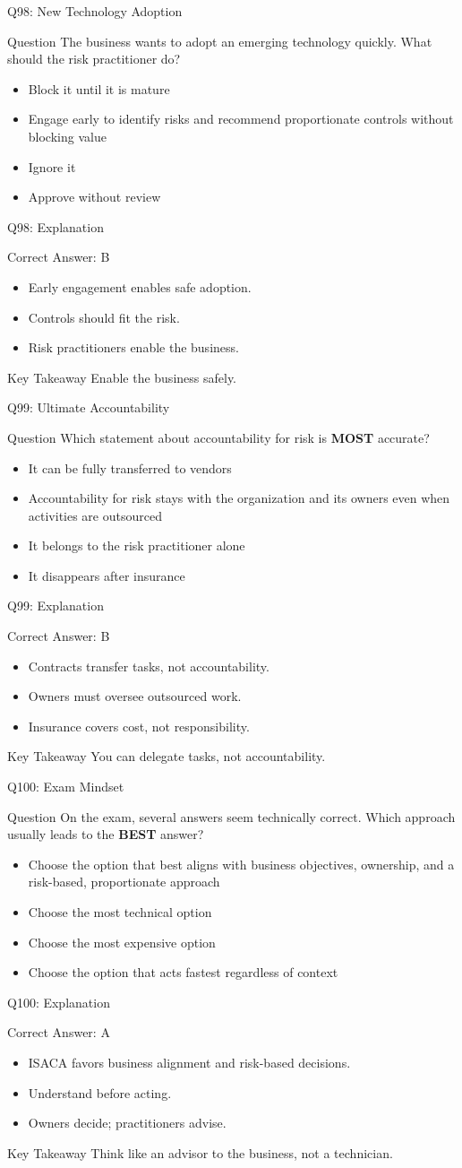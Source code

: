 \documentclass[aspectratio=169]{beamer}
\newcommand{\hq}[7]{%
	\begin{frame}{Q#1: #2}
		\begin{block}{Question}
			#3
		\end{block}
		\begin{itemize}
			#4
		\end{itemize}
	\end{frame}
	\begin{frame}{Q#1: Explanation}
		\begin{block}{Correct Answer: #5}
			\begin{itemize}
				#6
			\end{itemize}
		\end{block}
		\begin{alertblock}{Key Takeaway}
			#7
		\end{alertblock}
	\end{frame}
}
\begin{document}
	\hq{98}{New Technology Adoption}
	{The business wants to adopt an emerging technology quickly. What should the risk practitioner do?}
	{\item[\textbf{(A)}] Block it until it is mature
		\item[\textbf{(B)}] Engage early to identify risks and recommend proportionate controls without blocking value
		\item[\textbf{(C)}] Ignore it
		\item[\textbf{(D)}] Approve without review}
	{B}
	{\item Early engagement enables safe adoption.
		\item Controls should fit the risk.
		\item Risk practitioners enable the business.}
	{Enable the business safely.}
	
	\hq{99}{Ultimate Accountability}
	{Which statement about accountability for risk is \textbf{MOST} accurate?}
	{\item[\textbf{(A)}] It can be fully transferred to vendors
		\item[\textbf{(B)}] Accountability for risk stays with the organization and its owners even when activities are outsourced
		\item[\textbf{(C)}] It belongs to the risk practitioner alone
		\item[\textbf{(D)}] It disappears after insurance}
	{B}
	{\item Contracts transfer tasks, not accountability.
		\item Owners must oversee outsourced work.
		\item Insurance covers cost, not responsibility.}
	{You can delegate tasks, not accountability.}
	
	\hq{100}{Exam Mindset}
	{On the exam, several answers seem technically correct. Which approach usually leads to the \textbf{BEST} answer?}
	{\item[\textbf{(A)}] Choose the option that best aligns with business objectives, ownership, and a risk-based, proportionate approach
		\item[\textbf{(B)}] Choose the most technical option
		\item[\textbf{(C)}] Choose the most expensive option
		\item[\textbf{(D)}] Choose the option that acts fastest regardless of context}
	{A}
	{\item ISACA favors business alignment and risk-based decisions.
		\item Understand before acting.
		\item Owners decide; practitioners advise.}
	{Think like an advisor to the business, not a technician.}
	
\end{document}
